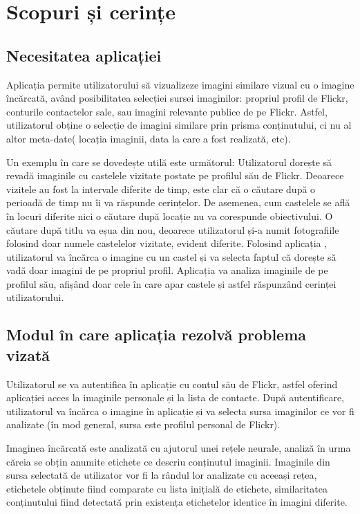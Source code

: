 \chapter{Scopuri și cerințe}
\section{Necesitatea aplicației}
Aplicația {\applicationtitle} permite utilizatorului să vizualizeze imagini similare vizual cu o imagine încărcată, având posibilitatea selecției sursei imaginilor: propriul profil de Flickr, conturile contactelor sale, sau imagini relevante publice de pe Flickr. Astfel, utilizatorul obține o selecție de imagini similare prin prisma conținutului, ci nu al altor meta-date( locația imaginii, data la care a fost realizată, etc). 

Un exemplu în care {\applicationtitle} se dovedește utilă este următorul: Utilizatorul dorește să revadă imaginile cu castelele vizitate postate pe profilul său de Flickr. Deoarece vizitele au fost la intervale diferite de timp, este clar că o căutare după o perioadă de timp nu îi va răspunde cerințelor. De asemenea, cum castelele se află în locuri diferite nici o căutare după locație nu va corespunde obiectivului. O căutare după titlu va eșua din nou, deoarece utilizatorul și-a numit fotografiile folosind doar numele castelelor vizitate, evident diferite. Folosind aplicația {\applicationtitle}, utilizatorul va încărca o imagine cu un castel și va selecta faptul că dorește să vadă doar imagini de pe propriul profil. Aplicația va analiza imaginile de pe profilul său, afișând doar cele în care apar castele și astfel răspunzând cerinței utilizatorului.

\section{Modul în care aplicația rezolvă problema vizată}
Utilizatorul se va autentifica în aplicație cu contul său de Flickr, astfel oferind aplicației acces la imaginile personale și la lista de contacte. După autentificare, utilizatorul va încărca o imagine în aplicație și va selecta sursa imaginilor ce vor fi analizate (în mod general, sursa este profilul personal de Flickr).

Imaginea încărcată este analizată cu ajutorul unei rețele neurale, analiză în urma căreia se obțin anumite etichete ce descriu conținutul imaginii. Imaginile din sursa selectată de utilizator vor fi la rândul lor analizate cu aceeași rețea, etichetele obținute fiind comparate cu lista inițială de etichete, similaritatea conținutului fiind detectată prin existența etichetelor identice în imagini diferite.

